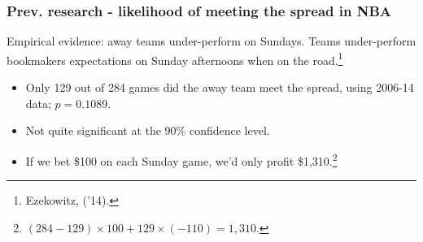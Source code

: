 \documentclass{beamer}
\begin{document}
\begin{frame}   \frametitle{Prev. research - likelihood of meeting the spread in NBA}
  \begin{block}{Empirical evidence: away teams under-perform on Sundays.}
  Teams under-perform bookmakers expectations on Sunday afternoons when on the road.\footnote{Ezekowitz, ('14).}
    \begin{itemize}       
    \item Only 129 out of 284 games did the away team meet the spread, 
      using 2006-14 data; $p=0.1089$.
    \item Not quite significant at the 90\% confidence level.     
    \item If we bet \$100 on each Sunday game, we'd only profit \$1,310.\footnote{$(284 - 129) \times 100 + 129 \times (-110) = 1,310$.} 
    \end{itemize}
  \end{block}
  \end{frame}








\end{document}
